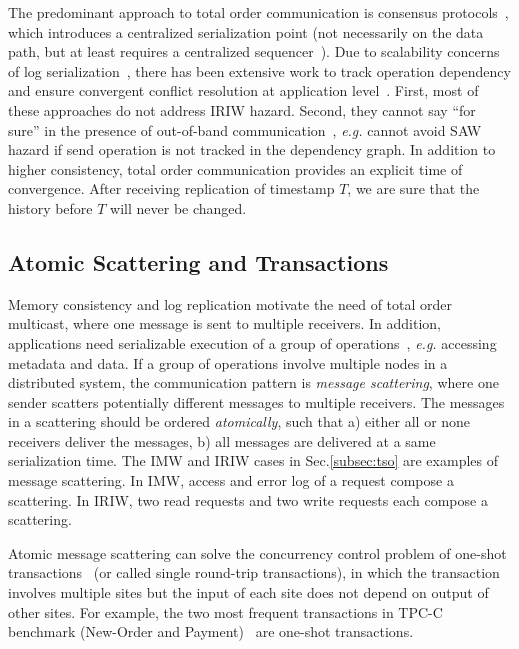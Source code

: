 The predominant approach to total order communication is consensus protocols~\cite{lamport1998part,raft}, which introduces a centralized serialization point (not necessarily on the data path, but at least requires a centralized sequencer~\cite{kaminsky2016design}). Due to scalability concerns of log serialization~\cite{anna}, there has been extensive work to track operation dependency and ensure convergent conflict resolution at application level~\cite{lloyd2011don,lloyd2013stronger}. First, most of these approaches do not address IRIW hazard. Second, they cannot say ``for sure'' in the presence of out-of-band communication~\cite{cheriton1994understanding}, \textit{e.g.} cannot avoid SAW hazard if send operation is not tracked in the dependency graph. In addition to higher consistency, total order communication provides an explicit time of convergence. After receiving replication of timestamp $T$, we are sure that the history before $T$ will never be changed.

\subsection{Atomic Scattering and Transactions}
\label{subsec:transactional-kvs}

Memory consistency and log replication motivate the need of total order multicast, where one message is sent to multiple receivers. In addition, applications need serializable execution of a group of operations~\cite{cheriton1994understanding}, \textit{e.g.} accessing metadata and data. If a group of operations involve multiple nodes in a distributed system, the communication pattern is \textit{message scattering}, where one sender scatters potentially different messages to multiple receivers. The messages in a scattering should be ordered \textit{atomically}, such that a) either all or none receivers deliver the messages, b) all messages are delivered at a same serialization time. The IMW and IRIW cases in Sec.\ref{subsec:tso} are examples of message scattering. In IMW, access and error log of a request compose a scattering. In IRIW, two read requests and two write requests each compose a scattering.

Atomic message scattering can solve the concurrency control problem of one-shot transactions~\cite{kallman2008h} (or called single round-trip transactions), in which the transaction involves multiple sites but the input of each site does not depend on output of other sites. For example, the two most frequent transactions in TPC-C benchmark (New-Order and Payment)~\cite{tpcc} are one-shot transactions.

